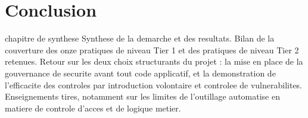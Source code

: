 ﻿%
\chapter{Conclusion}
\label{chap:conclusion}

\begin{constat}{chapitre de synthese}
Synthese de la demarche et des resultats. Bilan de la couverture des onze pratiques de niveau Tier 1 et des pratiques de niveau Tier 2 retenues. Retour sur les deux choix structurants du projet : la mise en place de la gouvernance de securite avant tout code applicatif, et la demonstration de l'efficacite des controles par introduction volontaire et controlee de vulnerabilites. Enseignements tires, notamment sur les limites de l'outillage automatise en matiere de controle d'acces et de logique metier.
\end{constat}
